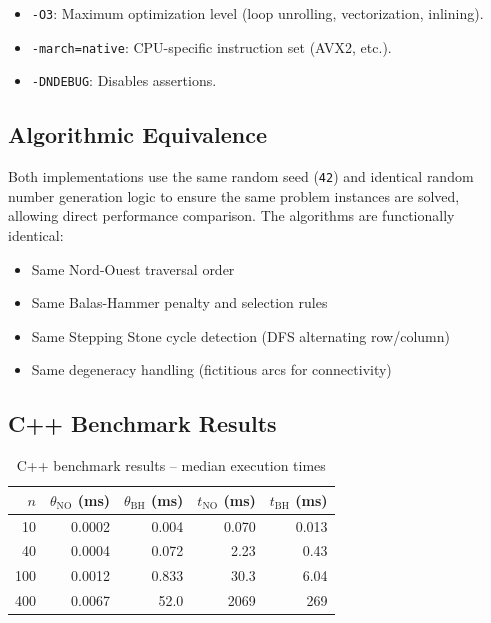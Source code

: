 \documentclass[12pt,a4paper]{article}
\begin{document}
\begin{itemize}
  \item \texttt{-O3}: Maximum optimization level (loop unrolling, vectorization, inlining).
  \item \texttt{-march=native}: CPU-specific instruction set (AVX2, etc.).
  \item \texttt{-DNDEBUG}: Disables assertions.
\end{itemize}

\subsection{Algorithmic Equivalence}

Both implementations use the same random seed (\texttt{42}) and identical random number generation logic to ensure the same problem instances are solved, allowing direct performance comparison. The algorithms are functionally identical:

\begin{itemize}
  \item Same Nord-Ouest traversal order
  \item Same Balas-Hammer penalty and selection rules
  \item Same Stepping Stone cycle detection (DFS alternating row/column)
  \item Same degeneracy handling (fictitious arcs for connectivity)
\end{itemize}

\subsection{C++ Benchmark Results}

\begin{table}[H]
\centering
\begin{tabular}{r|rr|rr}
\toprule
$n$ & $\theta_{\text{NO}}$ (ms) & $\theta_{\text{BH}}$ (ms) & $t_{\text{NO}}$ (ms) & $t_{\text{BH}}$ (ms) \\
\midrule
10  & 0.0002 & 0.004 & 0.070 & 0.013 \\
40  & 0.0004 & 0.072 & 2.23 & 0.43 \\
100 & 0.0012 & 0.833 & 30.3 & 6.04 \\
400 & 0.0067 & 52.0 & 2069 & 269 \\
\bottomrule
\end{tabular}
\caption{C++ benchmark results -- median execution times}
\label{tab:cpp-results}
\end{table}
\end{document}
